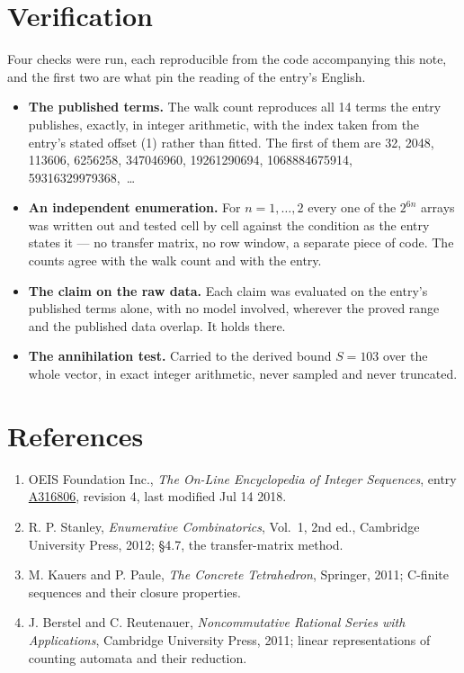 \documentclass[11pt]{article}
\theoremstyle{definition}
\begin{document}
\section{Verification}

Four checks were run, each reproducible from the code accompanying this note, and the first two are what pin the reading of the entry's English.

\begin{itemize}

\item {\bfseries The published terms.} The walk count reproduces all 14 terms the entry publishes, exactly, in integer arithmetic, with the index taken from the entry's stated offset (1) rather than fitted. The first of them are 32, 2048, 113606, 6256258, 347046960, 19261290694, 1068884675914, 59316329979368,~\dots

\item {\bfseries An independent enumeration.} For $n = 1,\dots,2$ every one of the $2^{6n}$ arrays was written out and tested cell by cell against the condition as the entry states it --- no transfer matrix, no row window, a separate piece of code. The counts agree with the walk count and with the entry.

\item {\bfseries The claim on the raw data.} Each claim was evaluated on the entry's published terms alone, with no model involved, wherever the proved range and the published data overlap. It holds there.

\item {\bfseries The annihilation test.} Carried to the derived bound $S = 103$ over the whole vector, in exact integer arithmetic, never sampled and never truncated.

\end{itemize}

\section{References}

\begin{enumerate}

\item OEIS Foundation Inc., \emph{The On-Line Encyclopedia of Integer Sequences}, entry \href{https://oeis.org/A316806}{A316806}, revision 4, last modified Jul 14 2018.

\item R. P. Stanley, \emph{Enumerative Combinatorics}, Vol.~1, 2nd ed., Cambridge University Press, 2012; \S4.7, the transfer-matrix method.

\item M. Kauers and P. Paule, \emph{The Concrete Tetrahedron}, Springer, 2011; C-finite sequences and their closure properties.

\item J. Berstel and C. Reutenauer, \emph{Noncommutative Rational Series with Applications}, Cambridge University Press, 2011; linear representations of counting automata and their reduction.

\end{enumerate}
\end{document}
